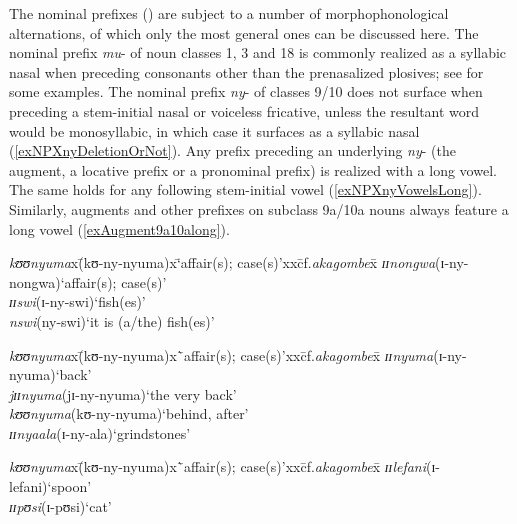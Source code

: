 The nominal prefixes () are subject to a number of morphophonological alternations, of which only the most general ones can be discussed here. The nominal prefix \mbox{\textit{mu}-} of noun classes 1, 3 and 18 is commonly realized as a syllabic nasal when preceding consonants other than the prenasalized plosives; see  for some examples. The nominal prefix \textit{ny}- of classes 9/10 does not surface when preceding a stem-initial nasal or voiceless fricative, unless the resultant word would be monosyllabic, in which case it surfaces as a syllabic nasal (\ref{exNPXnyDeletionOrNot}). Any prefix preceding an underlying \textit{ny}- (the augment, a locative prefix or a pronominal prefix) is realized with a long vowel. The same holds for any following stem-initial vowel (\ref{exNPXnyVowelsLong}). Similarly, augments and other prefixes on subclass 9a/10a nouns always feature a long vowel (\ref{exAugment9a10along}).

\begin{exe}
	\ex \label{exNPXnyDeletionOrNot}
	\begin{tabbing}
		\textit{kʊʊnyuma}x\=(\degree kʊ-ny-nyuma)x\=\lq affair(s); case(s)'xx\=cf.\textit{akagombe}x\=\kill%
		\textit{ɪɪnongwa}\>(\degree ɪ-ny-nongwa)\>\lq affair(s); case(s)'\\
		\textit{ɪɪswi}\>(\degree ɪ-ny-swi)\>`fish(es)'\\
		\textit{nswi}\>(\degree ny-swi)\>`it is (a/the) fish(es)'
	\end{tabbing}
	\ex \label{exNPXnyVowelsLong}
	\begin{tabbing}
		\textit{kʊʊnyuma}x\=(\degree kʊ-ny-nyuma)x\=`affair(s); case(s)'xx\=cf.\textit{akagombe}x\=\kill%
		\textit{ɪɪnyuma}\>(\degree ɪ-ny-nyuma)\>`back'\\
		\textit{jɪɪnyuma}\>(\degree jɪ-ny-nyuma)\>`the very back'\\
		\textit{kʊʊnyuma}\>(\degree kʊ-ny-nyuma)\>`behind, after'\\
		\textit{ɪɪnyaala}\>(\degree ɪ-ny-ala)\>`grindstones'
	\end{tabbing}
	\ex\label{exAugment9a10along}
	\begin{tabbing}
		\textit{kʊʊnyuma}x\=(\degree kʊ-ny-nyuma)x\=`affair(s); case(s)'xx\=cf.\textit{akagombe}x\=\kill
		\textit{ɪɪlefani}\>(\degree ɪ-lefani)\>`spoon'\\
		\textit{ɪɪpʊsi}\>(\degree ɪ-pʊsi)\>\lq cat'
	\end{tabbing}
\end{exe}

